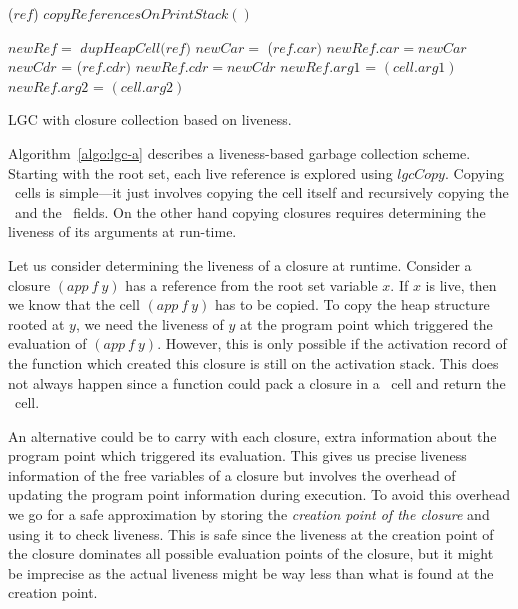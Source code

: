 \documentclass[9pt]{sigplanconf}
\begin{document}
\begin{algorithm}[t]
  \Fn{\Lgc{}}
     {
            {\Copy($\mathit{ref}$)\;}
            $\mathit{copyReferencesOnPrintStack()}$\;  
     }
     
        {
             {
               $\mathit{newRef} = $  $\mathit{dupHeapCell(ref})$\;
                  {
                    {
                      $\mathit{newCar}  = $  \Copy($\mathit{ref\!.car})$\;
                      $\mathit{newRef.car}   =  newCar$\;
                    }
                    {
                      $\mathit{newCdr}$ =   \Copy($\mathit{ref.cdr})$\;
                      $\mathit{newRef.cdr}   = \mathit{newCdr}$\;
                    }    
                  }
                   {
                     $\mathit{newRef.arg1}$ =  \Copy$\mathit{(cell.arg1)}$\;
                     $\mathit{newRef.arg2}$ =  \Copy$\mathit{(cell.arg2)}$\;
                   }
             }
        }

        \caption{LGC with closure collection based on liveness.\label{algo:lgc-a}}
\end{algorithm}
Algorithm~\ref{algo:lgc-a}   describes    a   liveness-based   garbage
collection scheme.  Starting with the root set, each live reference is
explored  using   $\mathit{  lgcCopy}$.    Copying  \CONS\   cells  is
simple---it  just involves  copying  the cell  itself and  recursively
copying the  \CAR\ and the  \CDR\ fields.   On the other  hand copying
closures  requires  determining  the  liveness  of  its  arguments  at
run-time.

Let   us  consider   determining  the   liveness  of   a  closure   at
runtime. Consider a closure $(app~f~y)$  has a reference from the root
set  variable  $x$.  If $x$  is  live,  then  we  know that  the  cell
$(app~f~y)$ has  to be copied.  To copy  the heap structure  rooted at
$y$, we need the liveness of  $y$ at the program point which triggered
the evaluation of  $(app~f~y)$. However, this is only  possible if the
activation record of the function  which created this closure is still
on the activation stack. This does  not always happen since a function
could pack a closure in a \CONS\ cell and return the \CONS\ cell.

An alternative could be to  carry with each closure, extra information
about the program point which triggered its evaluation.  This gives us
precise liveness  information of the  free variables of a  closure but
involves the overhead of updating the program point information during
execution.  To avoid  this overhead we go for a  safe approximation by
storing the {\em creation point of  the closure} and using it to check
liveness.  This  is safe since the  liveness at the creation  point of
the closure dominates  all possible evaluation points  of the closure,
but it  might be imprecise  as the actual  liveness might be  way less
than what is found at the creation point.
\end{document}

